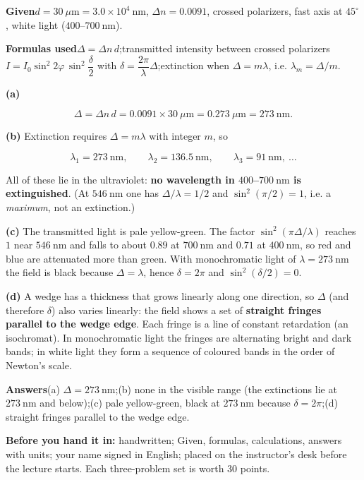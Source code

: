 \documentclass[11pt]{ctexart}
\begin{document}
\textbf{Given}\quad $d=30\ \mu\mathrm{m}=3.0\times10^{4}\ \mathrm{nm}$, $\Delta n=0.0091$, crossed
polarizers, fast axis at $45^\circ$, white light ($400$--$700\ \mathrm{nm}$).

\textbf{Formulas used}\quad $\Delta=\Delta n\,d$;\quad transmitted intensity between crossed polarizers
$I=I_0\sin^2 2\varphi\,\sin^2\dfrac{\delta}{2}$ with $\delta=\dfrac{2\pi}{\lambda}\Delta$;\quad extinction when
$\Delta=m\lambda$, i.e. $\lambda_m=\Delta/m$.

\textbf{(a)}

\[
\Delta=\Delta n\,d=0.0091\times30\ \mu\mathrm{m}=0.273\ \mu\mathrm{m}=273\ \mathrm{nm}.
\]

\textbf{(b)} Extinction requires $\Delta=m\lambda$ with integer $m$, so

\[
\lambda_1=273\ \mathrm{nm},\qquad \lambda_2=136.5\ \mathrm{nm},\qquad \lambda_3=91\ \mathrm{nm},\ \dots
\]

All of these lie in the ultraviolet: \textbf{no wavelength in $400$--$700\ \mathrm{nm}$ is extinguished}.
(At $546\ \mathrm{nm}$ one has $\Delta/\lambda=1/2$ and $\sin^2(\pi/2)=1$, i.e. a \emph{maximum}, not an
extinction.)

\textbf{(c)} The transmitted light is pale yellow-green. The factor $\sin^2(\pi\Delta/\lambda)$ reaches $1$ near
$546\ \mathrm{nm}$ and falls to about $0.89$ at $700\ \mathrm{nm}$ and $0.71$ at $400\ \mathrm{nm}$, so red and
blue are attenuated more than green. With monochromatic light of $\lambda=273\ \mathrm{nm}$ the field is black
because $\Delta=\lambda$, hence $\delta=2\pi$ and $\sin^2(\delta/2)=0$.

\textbf{(d)} A wedge has a thickness that grows linearly along one direction, so $\Delta$ (and therefore
$\delta$) also varies linearly: the field shows a set of \textbf{straight fringes parallel to the wedge edge}.
Each fringe is a line of constant retardation (an isochromat). In monochromatic light the fringes are
alternating bright and dark bands; in white light they form a sequence of coloured bands in the order of
Newton's scale.

\textbf{Answers}\quad (a) $\Delta=273\ \mathrm{nm}$;\quad (b) none in the visible range (the extinctions lie at
$273\ \mathrm{nm}$ and below);\quad (c) pale yellow-green, black at $273\ \mathrm{nm}$ because
$\delta=2\pi$;\quad (d) straight fringes parallel to the wedge edge.

\vspace{6pt}
{\small\color{inkgray}\textbf{Before you hand it in:} handwritten; Given, formulas, calculations, answers with
units; your name signed in English; placed on the instructor's desk before the lecture starts. Each
three-problem set is worth 30 points.}
\end{document}
